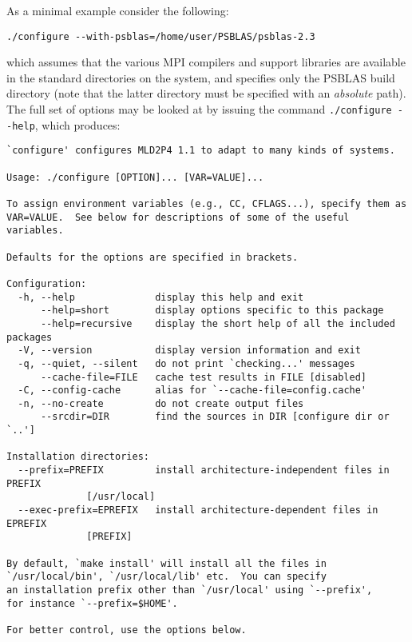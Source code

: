 As a minimal example consider the following:
\begin{verbatim}
./configure --with-psblas=/home/user/PSBLAS/psblas-2.3
\end{verbatim}
which assumes that the various MPI compilers and support libraries are
available in the standard directories on the system, and specifies
only the PSBLAS build directory (note that the latter directory must
be specified with an {\em absolute} path).
The full set of options may be looked at by issuing the command
\verb|./configure --help|, which produces:
\begin{verbatim}
`configure' configures MLD2P4 1.1 to adapt to many kinds of systems.

Usage: ./configure [OPTION]... [VAR=VALUE]...

To assign environment variables (e.g., CC, CFLAGS...), specify them as
VAR=VALUE.  See below for descriptions of some of the useful variables.

Defaults for the options are specified in brackets.

Configuration:
  -h, --help              display this help and exit
      --help=short        display options specific to this package
      --help=recursive    display the short help of all the included packages
  -V, --version           display version information and exit
  -q, --quiet, --silent   do not print `checking...' messages
      --cache-file=FILE   cache test results in FILE [disabled]
  -C, --config-cache      alias for `--cache-file=config.cache'
  -n, --no-create         do not create output files
      --srcdir=DIR        find the sources in DIR [configure dir or `..']

Installation directories:
  --prefix=PREFIX         install architecture-independent files in PREFIX
			  [/usr/local]
  --exec-prefix=EPREFIX   install architecture-dependent files in EPREFIX
			  [PREFIX]

By default, `make install' will install all the files in
`/usr/local/bin', `/usr/local/lib' etc.  You can specify
an installation prefix other than `/usr/local' using `--prefix',
for instance `--prefix=$HOME'.

For better control, use the options below.


\end{verbatim}
